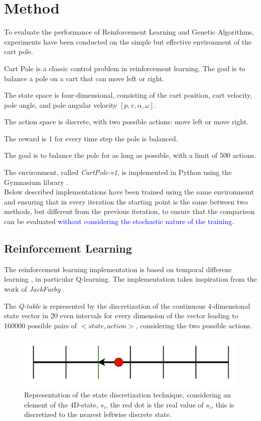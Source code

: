 \section{Method}
To evaluate the performance of Reinforcement Learning and Genetic Algorithms,
experiments have been conducted on the simple but effective environment of the cart pole.

Cart Pole is a classic control problem in reinforcement learning. 
The goal is to balance a pole on a cart that can move left or right. 

The state space is four-dimensional, consisting of the cart position, cart velocity, pole angle, and pole angular velocity $[p, v, \alpha, \omega]$. 

The action space is discrete, with two possible actions: move left or move right. 

The reward is 1 for every time step the pole is balanced.

The goal is to balance the pole for as long as possible, with a limit of 500 actions.

The environment, called \textit{CartPole-v1}, is implemented in Python using the Gymnasium library \cite{towers_gymnasium_2023}.
\\
Below described implementations have been trained using the same enviromnemt and ensuring that in every iteration the starting point is the same between two methods, but different from the previous iteration, to ensure that the comparison can be evaluated \textcolor{blue}{without considering the stochastic nature of the training}.

\subsection{Reinforcement Learning}
The reinforcement learning implementation is based on temporal differenc learning \cite{sutton1998temporal}, 
in particular Q-learning.
The implementation takes inspiration from the work of \textit{JackFurby} \cite{JackFurbyCartPole}.

The \textit{Q-table} is represented by the discretization of the continuous 4-dimensional state vector in 20 even intervals for every dimension of the vector leading to 160000 possible pairs of $<state,action>$, considering the two possible actions.

\begin{figure}[H]
	\centering
	\includegraphics [scale = 0.2]{Images/state_discretization.png}
	\caption{Representation of the state discretization technique, considering an element of the 4D-state, $s_i$, the red dot is the real value of $s_i$, this is discretized to the nearest leftwise discrete state.}
	\label{figDISC}
\end{figure}

